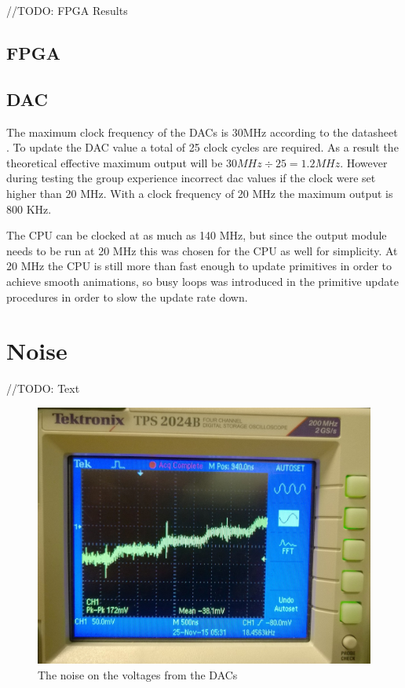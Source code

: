 //TODO: FPGA Results
\subsection{FPGA}

\subsection{DAC}
The maximum clock frequency of the DACs is 30MHz according to the datasheet \cite{dac-datasheet}.
To update the DAC value a total of 25 clock cycles are required.
As a result the theoretical effective maximum output will be \(30 MHz \div 25 = 1.2 MHz \).
However during testing the group experience incorrect \gls{dac} values if the clock were set higher than 20 MHz.
With a clock frequency of 20 MHz the maximum output is 800 KHz.

The CPU can be clocked at as much as 140 MHz, but since the output module needs to be run at 20 MHz this was chosen for the CPU as well for simplicity.
At 20 MHz the CPU is still more than fast enough to update primitives in order to achieve smooth animations, so busy loops was introduced in the primitive update procedures in order to slow the update rate down.

\section{Noise}

//TODO: Text

\begin{figure}[h!]
	    \includegraphics[width=\linewidth]{images/noise}
	    \caption{The noise on the voltages from the DACs}
	    \label{fig:noise}
\end{figure}



